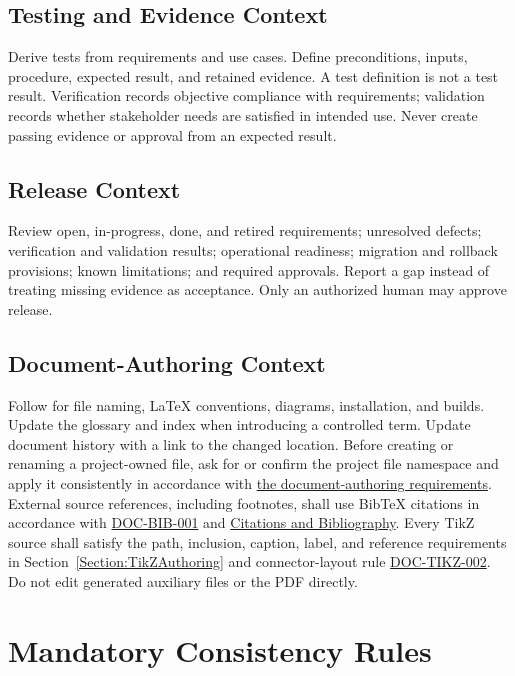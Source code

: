 \subsection{Testing and Evidence Context}
\label{Section:AITestingContext}
Derive tests from requirements and use cases. Define preconditions, inputs,
procedure, expected result, and retained evidence. A test definition is not a
test result. Verification records objective compliance with requirements;
validation records whether stakeholder needs are satisfied in intended use.
Never create passing evidence or approval from an expected result.

\subsection{Release Context}
\label{Section:AIReleaseContext}
Review open, in-progress, done, and retired requirements; unresolved defects;
verification and validation results; operational readiness; migration and
rollback provisions; known limitations; and required approvals. Report a gap
instead of treating missing evidence as acceptance. Only an authorized human
may approve release.

\subsection{Document-Authoring Context}
\label{Section:AIDocumentContext}
Follow  for file naming, LaTeX conventions, diagrams,
installation, and builds. Update the glossary and index when introducing a
controlled term. Update document history with a link to the changed location.
Before creating or renaming a project-owned file, ask for or confirm the
project file namespace and apply it consistently in accordance with
\hyperref[Table:DocumentAuthoringRequirements]{the document-authoring
requirements}.
External source references, including footnotes, shall use BibTeX citations
in accordance with \hyperref[Requirement:DOCBIB001]{DOC-BIB-001} and
\hyperref[Section:DocumentBibliography]{Citations and Bibliography}.
Every TikZ source shall satisfy the path, inclusion, caption, label, and
reference requirements in Section~\ref{Section:TikZAuthoring} and connector-layout rule \hyperref[Requirement:DOCTIKZ002]{DOC-TIKZ-002}. Do not edit
generated auxiliary files or the PDF directly.

\section{Mandatory Consistency Rules}
\label{Section:AIConsistencyRules}

